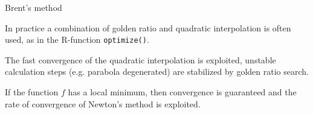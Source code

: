 \begin{vbframe}{Brent's method}

In practice a combination of golden ratio and quadratic interpolation is often used, as in the R-function \texttt{optimize()}.

\lz

The fast convergence of the quadratic interpolation is exploited, unstable calculation steps (e.g. parabola degenerated) are stabilized by golden ratio search.

\lz

If the function $f$ has a local minimum, then convergence is guaranteed and the rate of convergence of Newton's method is exploited.

\end{vbframe}


